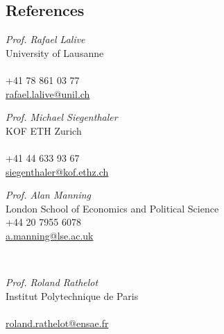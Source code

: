 \documentclass[letter, 11pt]{res}
\begin{document}
\begin{resume}
\section{References}
\vspace{0.5cm}
\noindent %
\begin{minipage}[t]{0.32\textwidth}
\textit{Prof. Rafael Lalive}\\
University of Lausanne\\
\\
+41 78 861 03 77\\
\href{mailto:Rafael.Lalive@unil.ch}{rafael.lalive@unil.ch}
\end{minipage}%
\hfill %
\begin{minipage}[t]{0.32\textwidth}
\textit{Prof. Michael Siegenthaler}\\
KOF ETH Zurich\\
\\
+41 44 633 93 67\\
\href{mailto:siegenthaler@kof.ethz.ch}{siegenthaler@kof.ethz.ch}
\end{minipage}%
\hfill %
\begin{minipage}[t]{0.32\textwidth}
\textit{Prof. Alan Manning}\\
London School of Economics and Political Science\\
+44 20 7955 6078\\
\href{mailto:a.manning@lse.ac.uk}{a.manning@lse.ac.uk}
\end{minipage}
\vspace{1.5cm}
\\
\noindent %
\begin{minipage}[t]{0.32\textwidth}
\textit{Prof. Roland Rathelot}\\
Institut Polytechnique de Paris\\
\\
\href{mailto:Roland.rathelot@ensae.fr}{roland.rathelot@ensae.fr}
\end{minipage}%
\end{resume}
\end{document}
